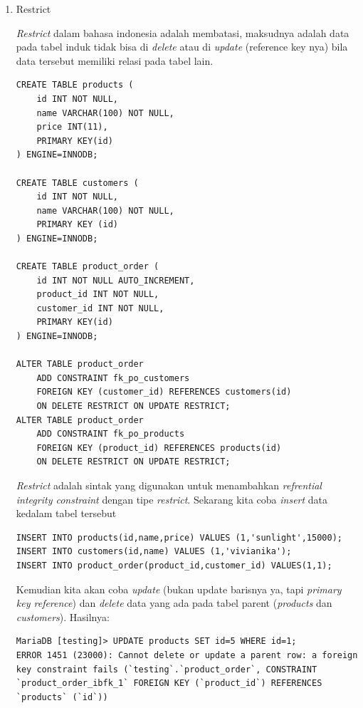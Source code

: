 \documentclass[a4paper]{article}
\begin{document}
\begin{enumerate}
	\item Restrict	

\textit{Restrict} dalam bahasa indonesia adalah membatasi, maksudnya adalah data pada tabel induk tidak bisa di \textit{delete} atau di \textit{update} (reference key nya) bila data tersebut memiliki relasi pada tabel lain.

\begin{lstlisting}
CREATE TABLE products (
    id INT NOT NULL,
    name VARCHAR(100) NOT NULL,
    price INT(11),
    PRIMARY KEY(id)
) ENGINE=INNODB;

CREATE TABLE customers (
    id INT NOT NULL,
    name VARCHAR(100) NOT NULL,
    PRIMARY KEY (id)
) ENGINE=INNODB;

CREATE TABLE product_order (
    id INT NOT NULL AUTO_INCREMENT,
    product_id INT NOT NULL,
    customer_id INT NOT NULL,
    PRIMARY KEY(id)
) ENGINE=INNODB;

ALTER TABLE product_order 
	ADD CONSTRAINT fk_po_customers 
	FOREIGN KEY (customer_id) REFERENCES customers(id)
	ON DELETE RESTRICT ON UPDATE RESTRICT;
ALTER TABLE product_order 
	ADD CONSTRAINT fk_po_products
	FOREIGN KEY (product_id) REFERENCES products(id)
	ON DELETE RESTRICT ON UPDATE RESTRICT;
\end{lstlisting}

\textit{Restrict} adalah sintak yang digunakan untuk menambahkan \textit{refrential integrity constraint} dengan tipe \textit{restrict}. Sekarang kita coba \textit{insert} data kedalam tabel tersebut

\begin{lstlisting}
INSERT INTO products(id,name,price) VALUES (1,'sunlight',15000);
INSERT INTO customers(id,name) VALUES (1,'vivianika');
INSERT INTO product_order(product_id,customer_id) VALUES(1,1);
\end{lstlisting}

Kemudian kita akan coba  \textit{update} (bukan update barisnya ya, tapi \textit{primary key reference}) dan \textit{delete} data yang ada pada tabel parent (\textit{products} dan \textit{customers}). Hasilnya:

\begin{lstlisting}
MariaDB [testing]> UPDATE products SET id=5 WHERE id=1;
ERROR 1451 (23000): Cannot delete or update a parent row: a foreign key constraint fails (`testing`.`product_order`, CONSTRAINT `product_order_ibfk_1` FOREIGN KEY (`product_id`) REFERENCES `products` (`id`))


\end{lstlisting}
\end{enumerate}
\end{document}
